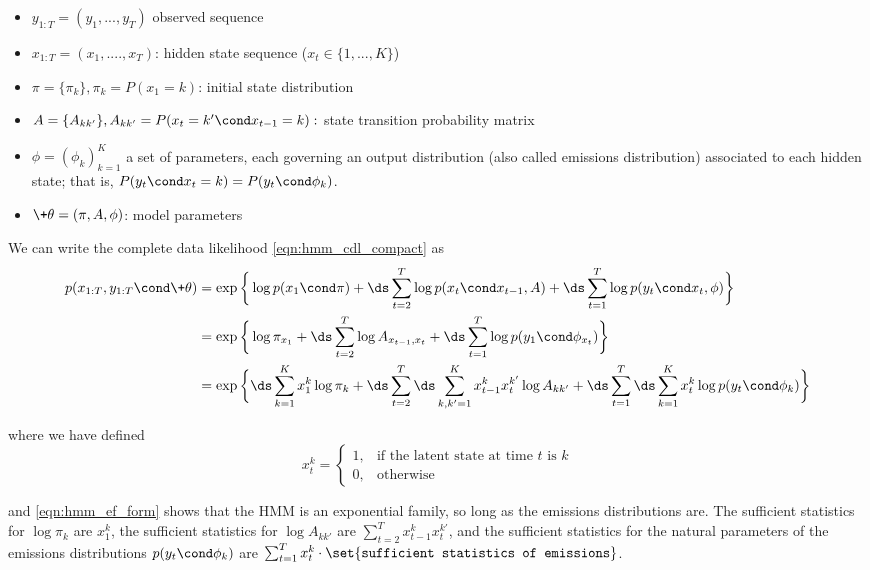 \documentclass{article} %
\newcommand{\param}{\+\theta}
\newcommand{\state}{x}
\begin{document}
\begin{example}
\begin{itemize}
\item $y_{1:T}=(y_1, ..., y_T)$ observed sequence
\item $\state_{1:T} =(\state_1, ...., \state_T)$: hidden state sequence ($\state_t \in \{1,...,K \}$) 
\item $\pi = \{ \pi_k \}, \pi_k = P(\state_1 = k)$: initial state distribution
\item $A=\{A_{kk'}\}, A_{kk'} = P(\state_t= k' \cond \state_{t-1}=k):$ state transition probability matrix 
\item $\phi = (\phi_k)_{k=1}^K$ a set of parameters, each governing an output distribution (also called emissions distribution) associated to each hidden state; that is, $ P(y_t \cond \state_t=k) = P(y_t \cond \phi_k)$. 
\item $\param = (\pi, A, \phi)$: model parameters
\end{itemize}


We can write the complete data likelihood \eqref{eqn:hmm_cdl_compact} as
\begin{align}
p(\state_{1:T}, y_{1:T} \cond \param) &=  \exp\bigg \{ \log p(\state_1 \cond \pi) + \ds\sum_{t=2}^T \log p(\state_t \cond \state_{t-1}, A) +  \ds\sum_{t=1}^T \log p(y_t \cond \state_t, \phi) \bigg\}  \nonumber \\
&= \exp \bigg \{ \log \pi_{\state_1}  + \ds\sum_{t=2}^T \log A_{\state_{t-1}, \state_t} + \ds\sum_{t=1}^T \log p(y_1 \cond \phi_{\state_t}) \bigg\} \nonumber \\
&=  \exp\bigg \{  \ds\sum_{k=1}^K \state_1^k \log \pi_k + \ds\sum_{t=2}^T \ds\sum_{k, k'=1}^K \state_{t-1}^k \state_t^{k'} \log A_{kk'} + \ds\sum_{t=1}^T \ds\sum_{k=1}^K \state_t^k \log p(y_t \cond \phi_k)  \bigg\} \label{eqn:hmm_ef_form}
\end{align}

where we have defined
\[ \state_t^k =  
\begin{cases}	  
1, & \text{if the latent state at time $t$ is $k$} \\
0, & \text{otherwise}
\end{cases} \]

and \eqref{eqn:hmm_ef_form} shows that the HMM is an exponential family, so long as the emissions distributions are. 
The sufficient statistics for $\log \pi_k$ are $\state_1^k$, the sufficient statistics for $\log A_{kk'}$ are $\sum_{t=2}^T \state_{t-1}^k \state_t^{k'}$, and the sufficient statistics for the natural parameters of the emissions distributions $p(y_t \cond \phi_k)$ are  $\sum_{t=1}^T \state_{t}^k \cdot \set{\texttt{sufficient statistics of emissions}}$.

\end{example}
\end{document}
